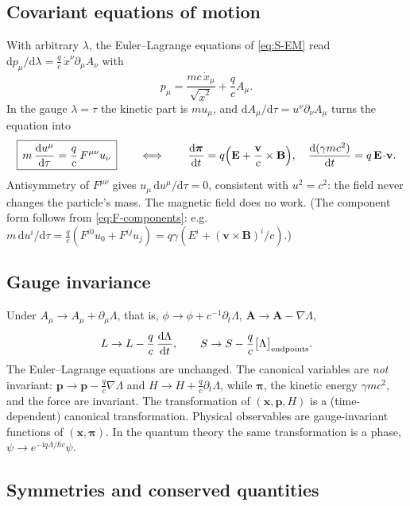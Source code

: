 \documentclass[11pt,a4paper]{book}
\numberwithin{equation}{section}
\newcommand{\dd}{\mathrm{d}}
\newcommand{\ii}{\mathrm{i}}
\newcommand{\bx}{\mathbf{x}}
\newcommand{\bv}{\mathbf{v}}
\newcommand{\bp}{\mathbf{p}}
\newcommand{\bA}{\mathbf{A}}
\newcommand{\bE}{\mathbf{E}}
\newcommand{\bB}{\mathbf{B}}
\newcommand{\bpi}{\boldsymbol{\pi}}
\theoremstyle{definition}
\theoremstyle{remark}
\begin{document}
\subsection{Covariant equations of motion}

With arbitrary $\lambda$, the Euler--Lagrange equations of
\eqref{eq:S-EM} read $\dd p_\mu/\dd\lambda=\tfrac qc\,\dot x^\nu\partial_\mu A_\nu$ with
\begin{equation}
  p_\mu=\frac{mc\,\dot x_\mu}{\sqrt{\dot x^2}}+\frac qc A_\mu .
  \label{eq:p-cov-EM}
\end{equation}
In the gauge $\lambda=\tau$ the kinetic part is $m u_\mu$, and
$\dd A_\mu/\dd\tau=u^\nu\partial_\nu A_\mu$ turns the equation into
\begin{equation}
  \boxed{\,m\,\frac{\dd u^\mu}{\dd\tau}=\frac qc\,F^{\mu\nu}u_\nu\,}
  \qquad\Longleftrightarrow\qquad
  \frac{\dd\bpi}{\dd t}=q\Bigl(\bE+\frac{\bv}c\times\bB\Bigr),\quad
  \frac{\dd(\gamma mc^2)}{\dd t}=q\,\bE\!\cdot\!\bv .
  \label{eq:Lorentz-cov}
\end{equation}
Antisymmetry of $F^{\mu\nu}$ gives $u_\mu\,\dd u^\mu/\dd\tau=0$, consistent with
$u^2=c^2$: the field never changes the particle's mass.  The magnetic
field does no work.  (The component form follows from
\eqref{eq:F-components}: e.g.\ $m\,\dd u^i/\dd\tau=\tfrac qc(F^{i0}u_0+F^{ij}u_j)
=q\gamma(E^i+(\bv\times\bB)^i/c)$.)

\subsection{Gauge invariance}

Under $A_\mu\to A_\mu+\partial_\mu\Lambda$, that is,
$\phi\to\phi+c^{-1}\partial_t\Lambda$, $\bA\to\bA-\nabla\Lambda$,
\begin{equation}
  L\to L-\frac qc\,\frac{\dd\Lambda}{\dd t},\qquad
  S\to S-\frac qc\bigl[\Lambda\bigr]_{\rm endpoints}.
\end{equation}
The Euler--Lagrange equations are unchanged.  The canonical variables are
\emph{not} invariant: $\bp\to\bp-\tfrac qc\nabla\Lambda$ and
$H\to H+\tfrac qc\partial_t\Lambda$, while $\bpi$, the kinetic energy
$\gamma mc^2$, and the force are invariant.  The transformation of
$(\bx,\bp,H)$ is a (time-dependent) canonical transformation.  Physical
observables are gauge-invariant functions of $(\bx,\bpi)$.  In the quantum
theory the same transformation is a phase,
$\psi\to e^{-\ii q\Lambda/\hbar c}\psi$.

\subsection{Symmetries and conserved quantities}
\end{document}
